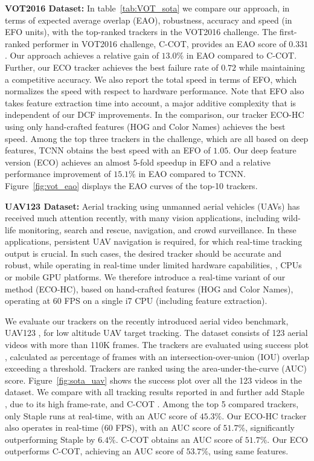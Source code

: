 \documentclass[10pt,twocolumn,letterpaper]{article}
\newcommand{\parsection}[1]{\noindent\textbf{#1:}}
\begin{document}
\parsection{VOT2016 Dataset}
In table~\ref{tab:VOT_sota} we compare our approach, in terms of expected average overlap (EAO), robustness, accuracy and speed (in EFO units), with the top-ranked trackers in the VOT2016 challenge. The first-ranked performer in VOT2016 challenge, C-COT, provides an EAO score of $0.331$. Our approach achieves a relative gain of $13.0\%$ in EAO compared to C-COT. Further, our ECO tracker achieves the best failure rate of $0.72$ while maintaining a competitive accuracy. We also report the total speed in terms of EFO, which normalizes the speed with respect to hardware performance. Note that EFO also takes feature extraction time into account, a major additive complexity that is independent of our DCF improvements. In the comparison, our tracker ECO-HC using only hand-crafted features (HOG and Color Names) achieves the best speed. Among the top three trackers in the challenge, which are all based on deep features, TCNN \cite{TCNN} obtains the best speed with an EFO of $1.05$. Our deep feature version (ECO) achieves an almost 5-fold speedup in EFO and a relative performance improvement of $15.1 \%$ in EAO compared to TCNN. Figure~\ref{fig:vot_eao} displays the EAO curves of the top-10 trackers.

\parsection{UAV123 Dataset}
Aerial tracking using unmanned aerial vehicles (UAVs) has received much attention recently, with many vision applications, including wild-life monitoring, search and rescue, navigation, and crowd surveillance. In these applications, persistent UAV navigation is required, for which real-time tracking output is crucial. In such cases, the desired tracker should be accurate and robust, while operating in real-time under limited hardware capabilities, \eg, CPUs or mobile GPU platforms. We therefore introduce a real-time variant of our method (ECO-HC), based on hand-crafted features (HOG and Color Names), operating at 60 FPS on a single i7 CPU (including feature extraction).

We evaluate our trackers on the recently introduced aerial video benchmark, UAV123 \cite{UAV123}, for low altitude UAV target tracking. The dataset consists of 123 aerial videos with more than 110K frames. The trackers are evaluated using success plot \cite{Wu13}, calculated as percentage of frames with an intersection-over-union (IOU) overlap exceeding a threshold. Trackers are ranked using the area-under-the-curve (AUC) score. Figure~\ref{fig:sota_uav} shows the success plot over all the 123 videos in the dataset. We compare with all tracking results reported in \cite{UAV123} and further add Staple \cite{Staple}, due to its high frame-rate, and C-COT \cite{DanelljanECCV2016}. Among the top 5 compared trackers, only Staple runs at real-time, with an AUC score of $45.3\%$. Our ECO-HC tracker also operates in real-time (60 FPS), with an AUC score of $51.7\%$, significantly outperforming Staple by $6.4\%$. C-COT obtains an AUC score of $51.7\%$. Our ECO outperforms C-COT, achieving an AUC score of $53.7\%$, using same features.
\end{document}
